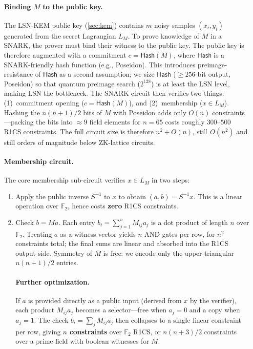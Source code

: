 \documentclass[11pt,a4paper]{article}
\theoremstyle{plain}
\theoremstyle{definition}
\newcommand{\F}{\mathbb{F}}
\begin{document}
\paragraph{Binding $M$ to the public key.}
The LSN-KEM public key (\cref{sec:kem}) contains $m$ noisy samples $(x_i, y_i)$ generated from the secret Lagrangian $L_M$. To prove knowledge of $M$ in a SNARK, the prover must bind their witness to the public key. The public key is therefore augmented with a commitment $c = \mathsf{Hash}(M)$, where $\mathsf{Hash}$ is a SNARK-friendly hash function (e.g., Poseidon). This introduces preimage-resistance of $\mathsf{Hash}$ as a second assumption; we size $\mathsf{Hash}$ ($\geq 256$-bit output, Poseidon) so that quantum preimage search ($2^{128}$) is at least the LSN level, making LSN the bottleneck. The SNARK circuit then verifies two things: (1)~commitment opening ($c = \mathsf{Hash}(M)$), and (2)~membership ($x \in L_M$). Hashing the $n(n+1)/2$ bits of $M$ with Poseidon adds only $O(n)$ constraints---packing the bits into $\approx 9$ field elements for $n=65$ costs roughly $300$--$500$ R1CS constraints. The full circuit size is therefore $n^2 + O(n)$, still $O(n^2)$ and still orders of magnitude below ZK-lattice circuits.

\paragraph{Membership circuit.}
The core membership sub-circuit verifies $x \in L_M$ in two steps:
\begin{enumerate}
\item Apply the public inverse $S^{-1}$ to $x$ to obtain $(a,b) = S^{-1}x$. This is a linear operation over $\F_2$, hence costs \textbf{zero} R1CS constraints.
\item Check $b = Ma$. Each entry $b_i = \sum_{j=1}^n M_{ij} a_j$ is a dot product of length $n$ over $\F_2$. Treating $a$ as a witness vector yields $n$ AND gates per row, for $n^2$ constraints total; the final sums are linear and absorbed into the R1CS output side. Symmetry of $M$ is free: we encode only the upper-triangular $n(n+1)/2$ entries.

\paragraph{Further optimization.} If $a$ is provided directly as a public input (derived from $x$ by the verifier), each product $M_{ij}a_j$ becomes a selector---free when $a_j=0$ and a copy when $a_j=1$. The check $b_i = \sum_j M_{ij}a_j$ then collapses to a single linear constraint per row, giving \textbf{$n$ constraints} over $\F_2$ R1CS, or $n(n+3)/2$ constraints over a prime field with boolean witnesses for $M$.
\end{enumerate}
\end{document}
